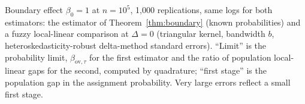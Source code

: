 \documentclass[12pt]{article}
\theoremstyle{definition}
\theoremstyle{remark}
\newcommand{\ov}{\mathrm{ov}}
\begin{document}
\begin{table}[tbp]
\centering\small
\tabRD
\caption{Boundary effect $\beta_0=1$ at $n=10^5$, 1,000 replications, same logs for
both estimators: the estimator of Theorem~\ref{thm:boundary} (known probabilities)
and a fuzzy local-linear comparison at $\Delta=0$ (triangular kernel, bandwidth $b$,
heteroskedasticity-robust delta-method standard errors). ``Limit'' is the probability
limit, $\beta_{\ov,\tau}$ for the first estimator and the ratio of population
local-linear gaps for the second, computed by quadrature; ``first stage'' is the
population gap in the assignment probability. Very large errors reflect a small first
stage.}
\label{tab:rd}
\end{table}
\end{document}
